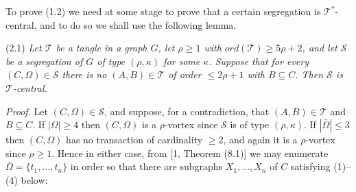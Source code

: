 
To prove (1.2) we need at some stage to prove that a certain segregation is $\mathscr{T}^*$-central, and to do so we shall use the following lemma.

\stmt
(2.1) \textit{Let $\mathscr{T}$ be a tangle in a graph $G$, let $\rho \ge 1$ with $ord(\mathscr{T}) \ge 5\rho+2$, and let $\mathscr{S}$ be a segregation of $G$ of type $(\rho, \kappa)$ for some $\kappa$. Suppose that for every $(C, \Omega) \in \mathscr{S}$ there is no $(A, B) \in \mathscr{T}$ of order $\le 2\rho+1$ with $B \subseteq C$. Then $\mathscr{S}$ is $\mathscr{T}$-central.}

\textit{Proof.} Let $(C, \Omega) \in \mathscr{S}$, and suppose, for a contradiction, that $(A, B) \in \mathscr{T}$ and $B \subseteq C$. If $|\Omega| \ge 4$ then $(C, \Omega)$ is a $\rho$-vortex since $\mathscr{S}$ is of type $(\rho, \kappa)$. If $|\bar{\Omega}| \le 3$ then $(C, \Omega)$ has no transaction of cardinality $\ge 2$, and again it is a $\rho$-vortex since $\rho \ge 1$.  Hence in either case, from [1, Theorem (8.1)] we may enumerate $\bar{\Omega} = \{t_1, \dots, t_n\}$ in order so that there are subgraphs $X_1, \dots, X_n$ of $C$ satisfying (1)--(4) below:
